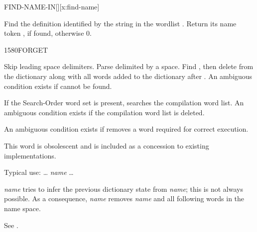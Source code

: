 \begin{worddef}{}{FIND-NAME-IN}[][x:find-name]
\item {}

	Find the definition identified by the string  in the wordlist
	.  Return its name token , if found, otherwise 0.


	\begin{implement}
	\end{implement}
	
	\begin{testing}
	\end{testing}
\end{worddef}


\pagebreak\vspace*{-6ex}
\begin{worddef}{1580}{FORGET}
\item {}

	Skip leading space delimiters. Parse  delimited by a
	space. Find , then delete  from the
	dictionary along with all words added to the dictionary after
	. An ambiguous condition exists if  cannot
	be found.

	If the Search-Order word set is present,  searches
	the compilation word list. An ambiguous condition exists if the
	compilation word list is deleted.

	An ambiguous condition exists if  removes a word
	required for correct execution.

\note This word is obsolescent and is included as a concession to
	existing implementations.


	\begin{rationale} %
		Typical use:
			{\ldots}  \emph{name} {\ldots}

		 \emph{name} tries to infer the previous dictionary
		state from \emph{name}; this is not always possible.  As a
		consequence,  \emph{name} removes \emph{name} and
		all following words in the name space.

		See .
	\end{rationale}
\end{worddef}

